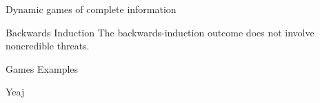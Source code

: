 \begin{titleboxchi}{Dynamic games of complete information}
\begin{definition}{Backwards Induction}
    The backwards-induction outcome does not involve noncredible threats.
        
    \end{definition}
    
    \begin{example}{Games Examples}
    
    \end{example}
    
    \begin{assumption}{Yeaj}
    
    \end{assumption}
    
\end{titleboxchi}